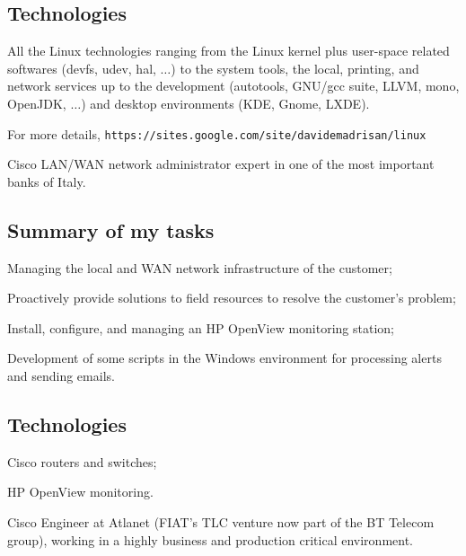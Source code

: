 \subsection{Technologies}

\noindent
All the Linux technologies ranging from the Linux kernel plus user-space 
related softwares (devfs, udev, hal, $\dots$) to the system tools, the local,
printing, and network services up to the development (autotools, GNU/gcc suite, 
LLVM, mono, OpenJDK, $\dots$) and desktop environments (KDE, Gnome, LXDE).

\nobreak
For more details,
\hfill\break\noindent
{\tt https:/\negthinspace/sites.google.com/site/davidemadrisan/linux}


\bigskip
{}
Cisco LAN/WAN network administrator expert in one of the most important banks of Italy.

\subsection{Summary of my tasks}

\item{\bdot} Managing the local and WAN network infrastructure of the customer;
\item{\bdot} Proactively provide solutions to field resources to resolve the 
   customer's problem;
\item{\bdot} Install, configure, and managing an HP OpenView monitoring station;
\item{\bdot} Development of some scripts in the Windows environment for 
   processing alerts and sending emails.

\subsection{Technologies}

\item{\bdot} Cisco routers and switches;
\item{\bdot} HP OpenView monitoring.
 

\bigskip

\noindent
Cisco Engineer at Atlanet (FIAT's TLC venture now part of the BT Telecom group), 
working in a highly business and production critical environment.

